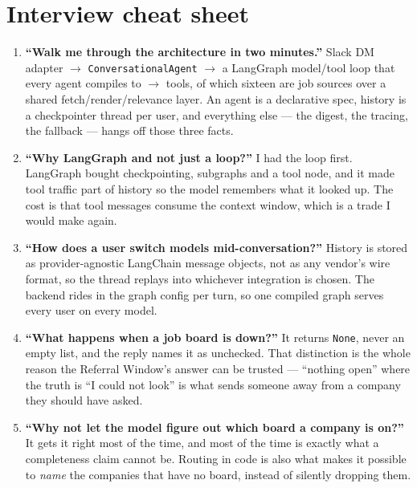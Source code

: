 \documentclass[11pt,a4paper]{article}
\begin{document}
\section{Interview cheat sheet}

\begin{enumerate}[leftmargin=1.4em,itemsep=5pt]
  \item \textbf{``Walk me through the architecture in two minutes.''} Slack DM adapter
    $\rightarrow$ \texttt{ConversationalAgent} $\rightarrow$ a LangGraph model/tool loop
    that every agent compiles to $\rightarrow$ tools, of which sixteen are job sources over a
    shared fetch/render/relevance layer. An agent is a declarative spec, history is a
    checkpointer thread per user, and everything else --- the digest, the tracing, the
    fallback --- hangs off those three facts.

  \item \textbf{``Why LangGraph and not just a loop?''} I had the loop first. LangGraph
    bought checkpointing, subgraphs and a tool node, and it made tool traffic part of history
    so the model remembers what it looked up. The cost is that tool messages consume the
    context window, which is a trade I would make again.

  \item \textbf{``How does a user switch models mid-conversation?''} History is stored as
    provider-agnostic LangChain message objects, not as any vendor's wire format, so the
    thread replays into whichever integration is chosen. The backend rides in the graph
    config per turn, so one compiled graph serves every user on every model.

  \item \textbf{``What happens when a job board is down?''} It returns \texttt{None}, never
    an empty list, and the reply names it as unchecked. That distinction is the whole
    reason the Referral Window's answer can be trusted --- ``nothing open'' where the truth
    is ``I could not look'' is what sends someone away from a company they should have asked.

  \item \textbf{``Why not let the model figure out which board a company is on?''} It gets it
    right most of the time, and most of the time is exactly what a completeness claim cannot
    be. Routing in code is also what makes it possible to \emph{name} the companies that have
    no board, instead of silently dropping them.


\end{enumerate}
\end{document}
